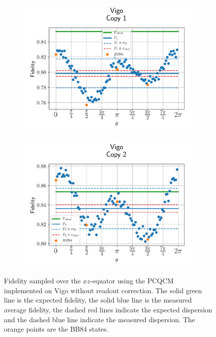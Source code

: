   
  \begin{figure}[htbp]
    \centering
    \begin{subfigure}{.5\textwidth}
      \centering
      \includegraphics[width=\textwidth]{Figures/PhaseCovariant/IBM/OnlyEquator/results_vigo_copy1.png}
      \label{fig:pc_uncorrected_vigo_equator_1}
    \end{subfigure}%
    \begin{subfigure}{.5\textwidth}
      \centering
      \includegraphics[width=\textwidth]{Figures/PhaseCovariant/IBM/OnlyEquator/results_vigo_copy2.png}
      \label{fig:pc_uncorrected_vigo_equator_2}
    \end{subfigure}
    \vspace{-0.5cm}
    \caption{Fidelity sampled over the $xz$-equator using the PCQCM implemented on Vigo without readout correction. The solid green line is the expected fidelity, the solid blue line is the measured average fidelity, the dashed red lines indicate the expected dispersion and the dashed blue line indicate the measured dispersion. The orange points are the BB84 states.}
    \label{fig:pc_uncorrected_vigo_equator}
  \end{figure}
  
